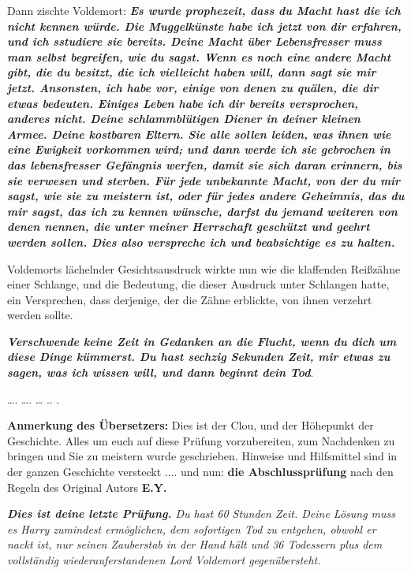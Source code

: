 Dann zischte Voldemort: \glqq{}\textbf{\emph{Es wurde prophezeit, dass du Macht
hast die ich nicht kennen würde. Die Muggelkünste habe ich jetzt von dir
erfahren, und ich sstudiere sie bereits. Deine Macht über Lebensfresser muss man
selbst begreifen, wie du sagst. Wenn es noch eine andere Macht gibt, die du
besitzt, die ich vielleicht haben will, dann sagt sie mir jetzt. Ansonsten, ich
habe vor, einige von denen zu quälen, die dir etwas bedeuten. Einiges Leben habe
ich dir bereits versprochen, anderes nicht. Deine schlammblütigen Diener in
deiner kleinen Armee. Deine kostbaren Eltern. Sie alle sollen leiden, was ihnen
wie eine Ewigkeit vorkommen wird; und dann werde ich sie gebrochen in das
lebensfresser Gefängnis werfen, damit sie sich daran erinnern, bis sie verwesen
und sterben. Für jede unbekannte Macht, von der du mir sagst, wie sie zu
meistern ist, oder für jedes andere Geheimnis, das du mir sagst, das ich zu
kennen wünsche, darfst du jemand weiteren von denen nennen, die unter meiner
Herrschaft geschützt und geehrt werden sollen. Dies also verspreche ich und
beabsichtige es zu halten.}}\grqq{}

Voldemorts lächelnder Gesichtsausdruck wirkte nun wie die klaffenden Reißzähne
einer Schlange, und die Bedeutung, die dieser Ausdruck unter Schlangen hatte,
ein Versprechen, dass derjenige, der die Zähne erblickte, von ihnen verzehrt
werden sollte.

\glqq{}\textbf{\emph{Verschwende keine Zeit in Gedanken an die Flucht, wenn du
dich um diese Dinge kümmerst. Du hast sechzig Sekunden Zeit, mir etwas zu sagen,
was ich wissen will, und dann beginnt dein Tod}}.\grqq{}

…. …. … .. .

\textbf{Anmerkung des Übersetzers:}
Dies ist der Clou, und der Höhepunkt der Geschichte. Alles um euch auf diese
Prüfung vorzubereiten, zum Nachdenken zu bringen und Sie zu meistern wurde
geschrieben. Hinweise und Hilfsmittel sind in der ganzen Geschichte
versteckt .... und nun: \textbf{die Abschlussprüfung} nach den Regeln des
Original Autors\textbf{ E.Y.}



\emph{
\textbf{Dies ist deine letzte Prüfung.}
Du hast 60 Stunden Zeit. Deine Lösung muss es Harry zumindest ermöglichen, dem
sofortigen Tod zu entgehen, obwohl er nackt ist, nur seinen Zauberstab in der
Hand hält und 36 Todessern plus dem vollständig wiederauferstandenen Lord
Voldemort gegenübersteht.}

